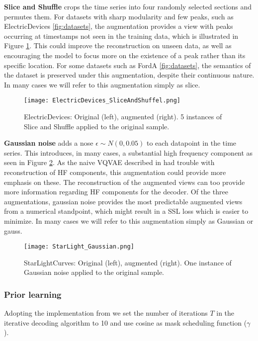 \documentclass[../../thesis.tex]{subfiles}
\begin{document}
\textbf{Slice and Shuffle} crops the time series into four randomly selected sections and permutes them. For datasets with sharp modularity and few peaks, such as ElectricDevices \ref{fig:datasets}, the augmentation provides a view with peaks occurring at timestamps not seen in the training data, which is illustrated in Figure \ref{fig:ElectricDevices_SliceAndShuffel}. This could improve the reconstruction on unseen data, as well as encouraging the model to focus more on the existence of a peak rather than its specific location. For some datasets such as FordA \ref{fig:datasets}, the semantics of the dataset is preserved under this augmentation, despite their continuous nature. In many cases we will refer to this augmentation simply as slice.\newline
\begin{figure}[h]
    \texttt{[image: ElectricDevices\_SliceAndShuffel.png]}
    \centering
    \caption{ElectricDevices: Original (left), augmented (right). 5 instances of Slice and Shuffle applied to the original sample.}
    \label{fig:ElectricDevices_SliceAndShuffel}
\end{figure}

\textbf{Gaussian noise} adds a nose $\epsilon \sim N(0,0.05)$ to each datapoint in the time series. This introduces, in many cases, a substantial high frequency component as seen in Figure \ref{fig:StarLight_Gaussian}. As the naive VQVAE described in \cite{TimeVQVAE} had trouble with reconstruction of HF components, this augmentation could provide more emphasis on these. The reconstruction of the augmented views can too provide more information regarding HF components for the decoder. Of the three augmentations, gaussian noise provides the most predictable augmented views from a numerical standpoint, which might result in a SSL loss which is easier to minimize. In many cases we will refer to this augmentation simply as Gaussian or gauss.
\begin{figure}[h]
    \texttt{[image: StarLight\_Gaussian.png]}
    \centering
    \caption{StarLightCurves: Original (left), augmented (right). One instance of Gaussian noise applied to the original sample.}
    \label{fig:StarLight_Gaussian}
\end{figure}



\subsubsection{Prior learning}
Adopting the implementation from \cite{chang2022maskgit} we set the number of iterations $T$ in the iterative decoding algorithm to 10 and use cosine as mask scheduling function ($\gamma$). \newline
\end{document}
